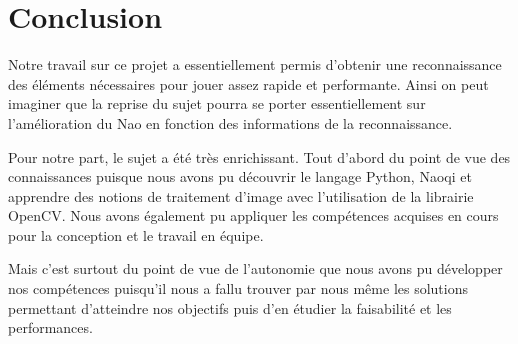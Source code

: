 \section{Conclusion}
\label{sec:Conclusion}
\par Notre travail sur ce projet a essentiellement permis d'obtenir une reconnaissance des éléments nécessaires pour jouer assez rapide et performante. Ainsi on peut imaginer que la reprise du sujet pourra se porter essentiellement sur l'amélioration du Nao en fonction des informations de la reconnaissance.
\par Pour notre part, le sujet a été très enrichissant. Tout d'abord du point de vue des connaissances puisque nous avons pu découvrir le langage Python, Naoqi et apprendre des notions de traitement d'image avec l'utilisation de la librairie OpenCV. Nous avons également pu appliquer les compétences acquises en cours pour la conception et le travail en équipe. 
\par Mais c'est surtout du point de vue de l'autonomie que nous avons pu   développer nos compétences puisqu'il nous a fallu trouver par nous même les solutions permettant d'atteindre nos objectifs puis d'en étudier la faisabilité et les performances.


\pagebreak
